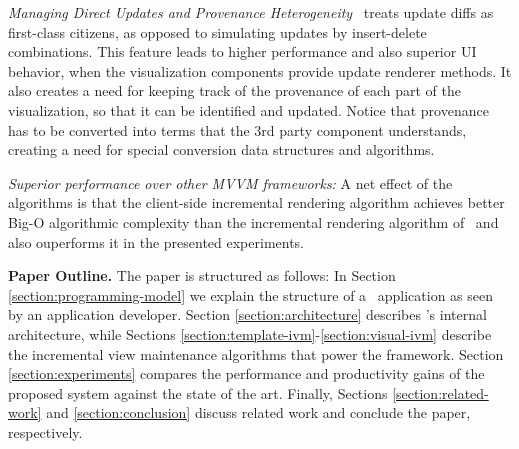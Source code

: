 \begin{compact_item}
\begin{compact_enum}
%
\item \textit{Managing Direct Updates and Provenance Heterogeneity} \projname\ treats update diffs as first-class citizens, as opposed to simulating updates by insert-delete combinations.  This feature leads to higher performance and also superior UI behavior, when the visualization components provide update renderer methods. It also creates a need for keeping track of the provenance of each part of the visualization, so that it can be identified and updated. Notice that provenance has to be converted into terms that the 3rd party component understands, creating a need for special conversion data structures and algorithms. 
\end{compact_enum}
%
\item \textit{Superior performance over other MVVM frameworks:} A net effect of the algorithms is that the client-side incremental rendering algorithm achieves better Big-O algorithmic complexity than the incremental rendering algorithm of \angular\ and also ouperforms it in the presented experiments.
%
\end{compact_item}

{\bf Paper Outline.}  The paper is structured as follows: In Section \ref{section:programming-model} we explain the structure of a \projname\ application as seen by an application developer. Section \ref{section:architecture} describes \projname's internal architecture, while Sections \ref{section:template-ivm}-\ref{section:visual-ivm} describe the incremental view maintenance algorithms that power the framework. Section \ref{section:experiments} compares the performance and productivity gains of the proposed system against the state of the art. Finally, Sections \ref{section:related-work} and \ref{section:conclusion} discuss related work and conclude the paper, respectively.